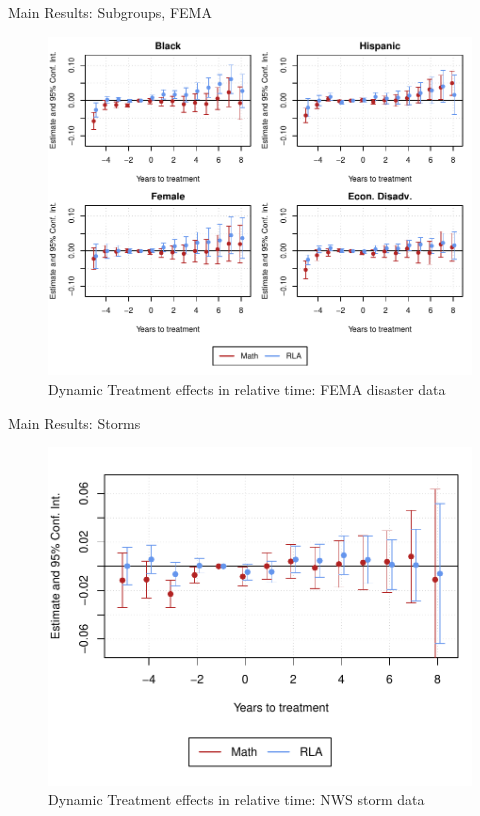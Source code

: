 \documentclass[hyperref={colorlinks = true,linkcolor = blue, citecolor=blue,urlcolor=blue}]{beamer}
\begin{document}
\begin{frame}{Main Results: Subgroups, FEMA}
	\begin{figure}[!h]
		\centering
		\includegraphics[scale=0.6]{"../Code & Data/ResultsPlotPresentationSubgroups.pdf"}
		\caption{Dynamic Treatment effects in relative time: FEMA disaster data}
	\end{figure}
\end{frame}


\begin{frame}{Main Results: Storms}
	\begin{figure}[!h]
		\centering
		\includegraphics[scale=0.6]{"../Code & Data/ResultsPlotStormsPresentation.pdf"}
		\caption{Dynamic Treatment effects in relative time: NWS storm data}
	\end{figure}
\end{frame}
\end{document}
